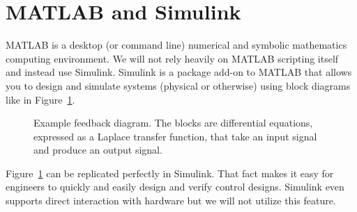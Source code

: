 \documentclass[letterpaper, 12pt, oneside]{memoir}
\begin{document}
\section{MATLAB and Simulink}
MATLAB is a desktop (or command line) numerical and symbolic
mathematics computing environment. We will not rely heavily on MATLAB
scripting itself and instead use Simulink. Simulink is a
package add-on to MATLAB that allows you to design and simulate
systems (physical or otherwise) using block diagrams like in
Figure~\ref{fig:intro:1}.
%
\begin{figure}
  \centering
  \caption{
    Example feedback diagram. The blocks are differential equations, expressed
    as a Laplace transfer function, that take an input signal and produce an
    output signal.
  }
  \label{fig:intro:1}
\end{figure}
%
Figure~\ref{fig:intro:1} can be replicated perfectly in Simulink.
That fact makes it easy for engineers to quickly and easily design and verify
control designs. Simulink even supports direct interaction with
hardware but we will not utilize this feature.
\end{document}
